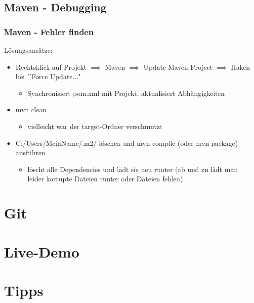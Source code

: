 \documentclass[18pt]{beamer}
\begin{document}
	\subsection{Maven - Debugging}
	\begin{frame}
		\frametitle{Maven - Fehler finden}
		Lösungsansätze:
		\begin{itemize}
			\item Rechtsklick auf Projekt $\implies$ Maven $\implies$ Update Maven Project $\implies$ Haken bei "'Force Update..." 
			\begin{itemize}
				\item Synchronisiert pom.xml mit Projekt, aktualisiert Abhängigkeiten
			\end{itemize}
			\item mvn clean
			\begin{itemize}
				\item vielleicht war der target-Ordner verschmutzt
			\end{itemize}
			\item C:/Users/MeinName/.m2/ löschen und mvn compile (oder mvn package) ausführen
			\begin{itemize}
				\item löscht alle Dependencies und lädt sie neu runter (ab und zu lädt man leider korrupte Dateien runter oder Dateien fehlen)
			\end{itemize}
		\end{itemize}
	\end{frame}


\section{Git}
		
\section{Live-Demo}		
		
\section{Tipps}
		
\end{document}
